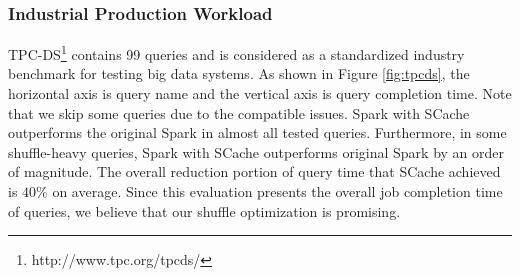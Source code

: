 \subsubsection{Industrial Production Workload}
TPC-DS\footnote{http://www.tpc.org/tpcds/} contains 99 queries and is considered as a standardized industry benchmark for testing big data systems. 
As shown in Figure \ref{fig:tpcds}, the horizontal axis is query name and the vertical axis is query completion time. 
Note that we skip some queries due to the compatible issues. 
Spark with SCache outperforms the original Spark in almost all tested queries. 
Furthermore, in some shuffle-heavy queries, Spark with SCache outperforms original Spark by an order of magnitude. 
The overall reduction portion of query time that SCache achieved is $40\%$ on average. 
Since this evaluation presents the overall job completion time of queries, we believe that our shuffle optimization is promising.

